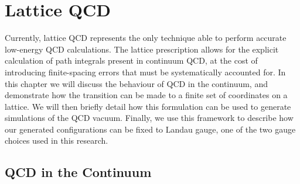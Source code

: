 
\chapter{Lattice QCD}\label{chapter:LatticeQCD}

\ifpdf
    \graphicspath{{Chapter2/Figs/Raster/}{Chapter2/Figs/PDF/}{Chapter2/Figs/}}
\else
    \graphicspath{{Chapter2/Figs/Vector/}{Chapter2/Figs/}}
\fi
Currently, lattice QCD represents the only technique able to perform accurate low-energy QCD calculations. The lattice prescription allows for the explicit calculation of path integrals present in continuum QCD, at the cost of introducing finite-spacing errors that must be systematically accounted for. In this chapter we will discuss the behaviour of QCD in the continuum, and demonstrate how the transition can be made to a finite set of coordinates on a lattice. We will then briefly detail how this formulation can be used to generate simulations of the QCD vacuum. Finally, we use this framework to describe how our generated configurations can be fixed to Landau gauge, one of the two gauge choices used in this research.

\section{QCD in the Continuum}
